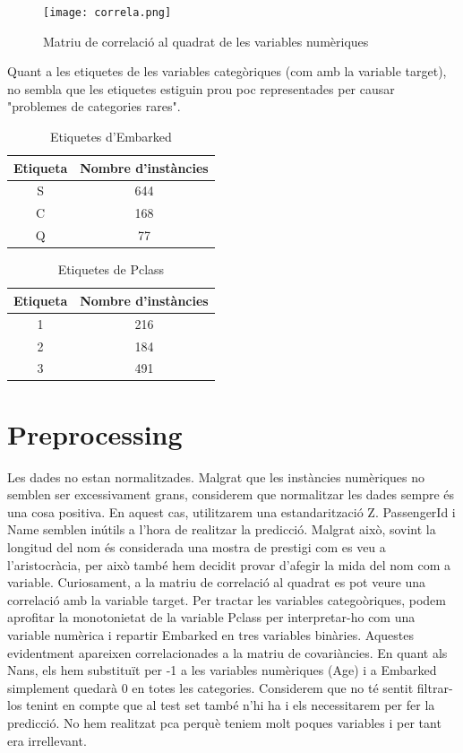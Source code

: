 \documentclass[9pt,a4paper,twoside]{tau-class/tau}
\begin{document}
\begin{figure}[H]
    \centering
    \texttt{[image: correla.png]}
    \caption{Matriu de correlació al quadrat de les variables numèriques}
    \label{fig:correlacio}
\end{figure}

Quant a les etiquetes de les variables categòriques (com amb la variable target), no sembla que les etiquetes estiguin prou poc representades per causar "problemes de categories rares".

\begin{table}[H]
		\centering
		\caption{Etiquetes d'Embarked}
		\label{tab:etiquetes_embarked}
		\begin{tabular}{cc}
			\toprule
			\textbf{Etiqueta} & \textbf{Nombre d'instàncies}\\
			\midrule
			S & 644\\
            C & 168\\
            Q & 77\\
            \bottomrule
		\end{tabular}			
	\end{table}

\begin{table}[H]
		\centering
		\caption{Etiquetes de Pclass}
		\label{tab:etiquetes_pclass}
		\begin{tabular}{cc}
			\toprule
			\textbf{Etiqueta} & \textbf{Nombre d'instàncies}\\
			\midrule
			1 & 216\\
            2 & 184\\
            3 & 491\\
            \bottomrule
		\end{tabular}			
	\end{table}
    
\section{Preprocessing}
    Les dades no estan normalitzades. Malgrat que les instàncies numèriques no semblen ser excessivament grans, considerem que normalitzar les dades sempre és una cosa positiva.
    En aquest cas, utilitzarem una estandarització Z. 
    PassengerId i Name semblen inútils a l'hora de realitzar la predicció. Malgrat això, sovint la longitud del nom és considerada una mostra de prestigi com es veu a l'aristocràcia, per això també hem decidit provar 
    d'afegir la mida del nom com a variable. Curiosament, a la matriu de correlació al quadrat es pot veure una correlació amb la variable target. 
    Per tractar les variables categoòriques, podem aprofitar la monotonietat de la variable Pclass per interpretar-ho com una variable numèrica i repartir Embarked en tres variables binàries. Aquestes evidentment apareixen correlacionades a la matriu de covariàncies. 
    En quant als Nans, els hem substituït per -1 a les variables numèriques (Age) i a Embarked simplement quedarà 0 en totes les categories.
    Considerem que no té sentit filtrar-los tenint en compte que al test set també n'hi ha i els necessitarem per fer la predicció.
    No hem realitzat pca perquè teniem molt poques variables i per tant era irrellevant.
\end{document}
